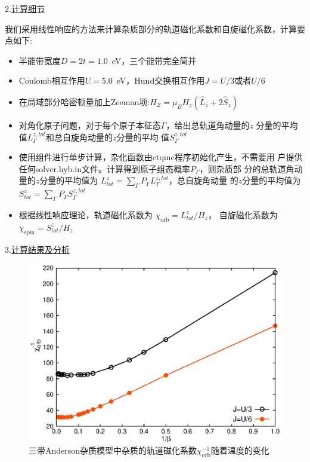 2.\underline{计算细节}

我们采用线性响应的方法来计算杂质部分的轨道磁化系数和自旋磁化系数，计算要点如下:
\begin{itemize}
  \item 半能带宽度$D= 2t=1.0$\ eV，三个能带完全简并
  \item Coulomb相互作用$U=5.0$\ eV，Hund交换相互作用$J = U/3$或者$U/6$
  \item 在局域部分哈密顿量加上Zeeman项:$H_{Z} = \mu_{B}H_{z}(\hat{L}_{z} + 2\hat{S}_{z})$
  \item 对角化原子问题，对于每个原子本征态$\Gamma$，给出总轨道角动量的$z$
        分量的平均值$L^{z,tot}_{\Gamma}$和总自旋角动量的$z$分量的平均
        值$S^{z,tot}_{\Gamma}$
  \item 使用{\begonia}组件进行单步计算，杂化函数由ctqmc程序初始化产生，不需要用
        户提供任何solver.hyb.in文件。计算得到原子组态概率$P_{\Gamma}$，则杂质部
        分的总轨道角动量的$z$分量的平均值为
        $L^{z}_{tot}=\sum_{\Gamma} P_{\Gamma} L^{z,tot}_{\Gamma}$，总自旋角动量
        的$z$分量的平均值为
        $S^{z}_{tot}=\sum_{\Gamma} P_{\Gamma} S^{z,tot}_{\Gamma}$
  \item 根据线性响应理论，轨道磁化系数为
        $\chi_{\text{orb}}=L^{z}_{tot}/H_{z}$，
        自旋磁化系数为
        $\chi_{\text{spin}}=S^{z}_{tot}/H_{z}$
\end{itemize}

3.\underline{计算结果及分析}

\begin{figure}
\centering
\includegraphics{figure/orb_chi.eps}
\caption{三带Anderson杂质模型中杂质的轨道磁化系数$\chi^{-1}_{\text{orb}}$随着温度的变化} 
\label{fig:orb_chi}
\end{figure}

